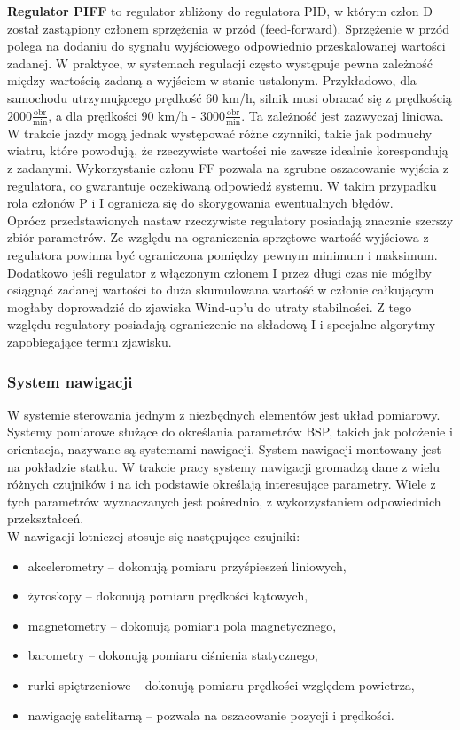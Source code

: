 \textbf{Regulator PIFF} to regulator zbliżony do regulatora PID, w którym człon D został zastąpiony członem sprzężenia w przód (feed-forward). Sprzężenie w przód polega na dodaniu do sygnału wyjściowego odpowiednio przeskalowanej wartości zadanej. W praktyce, w systemach regulacji często występuje pewna zależność między wartością zadaną a wyjściem w stanie ustalonym. Przykładowo, dla samochodu utrzymującego prędkość 60 km/h, silnik musi obracać się z prędkością $2000 \frac{\text{obr}}{\text{min}}$, a dla prędkości 90 km/h - $3000 \frac{\text{obr}}{\text{min}}$. Ta zależność jest zazwyczaj liniowa. W trakcie jazdy mogą jednak występować różne czynniki, takie jak podmuchy wiatru, które powodują, że rzeczywiste wartości nie zawsze idealnie korespondują z zadanymi. Wykorzystanie członu FF pozwala na zgrubne oszacowanie wyjścia z regulatora, co gwarantuje oczekiwaną odpowiedź systemu. W takim przypadku rola członów P i I ogranicza się do skorygowania ewentualnych błędów. \\

Oprócz przedstawionych nastaw rzeczywiste regulatory posiadają znacznie szerszy zbiór parametrów. Ze względu na ograniczenia sprzętowe wartość wyjściowa z regulatora powinna być ograniczona pomiędzy pewnym minimum i maksimum. Dodatkowo jeśli regulator z włączonym członem I przez długi czas nie mógłby osiągnąć zadanej wartości to duża skumulowana wartość w członie całkującym mogłaby doprowadzić do zjawiska Wind-up'u do utraty stabilności. Z tego względu regulatory posiadają ograniczenie na składową I i specjalne algorytmy zapobiegające termu zjawisku. 

\subsubsection{System nawigacji}

W systemie sterowania jednym z niezbędnych elementów jest układ pomiarowy. Systemy pomiarowe służące do określania parametrów BSP, takich jak położenie i orientacja, nazywane są systemami nawigacji. System nawigacji montowany jest na pokładzie statku. W trakcie pracy systemy nawigacji gromadzą dane z wielu różnych czujników i na ich podstawie określają interesujące parametry. Wiele z tych parametrów wyznaczanych jest pośrednio, z wykorzystaniem odpowiednich przekształceń.\\

W nawigacji lotniczej stosuje się następujące czujniki:
\begin{itemize}
  \item akcelerometry -- dokonują pomiaru przyśpieszeń liniowych,
  \item żyroskopy -- dokonują pomiaru prędkości kątowych,
  \item magnetometry -- dokonują pomiaru pola magnetycznego,
  \item barometry -- dokonują pomiaru ciśnienia statycznego,
  \item rurki spiętrzeniowe -- dokonują pomiaru prędkości względem powietrza,
  \item nawigację satelitarną -- pozwala na oszacowanie pozycji i prędkości.
\end{itemize}

